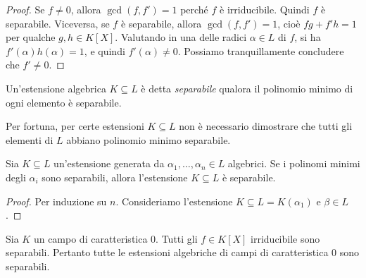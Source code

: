 \begin{proof}
Se $f \ne 0$, allora $\gcd(f, f') = 1$ perché $f$ è irriducibile. Quindi $f$ è separabile. Viceversa, se $f$ è separabile, allora $\gcd(f, f') = 1$, cioè $fg + f'h = 1$ per qualche $g, h \in K[X]$. Valutando in una delle radici $\alpha \in L$ di $f$, si ha $f'(\alpha) h(\alpha) = 1$, e quindi $f'(\alpha) \ne 0$. Possiamo tranquillamente concludere che $f' \ne 0$.
\end{proof}

\begin{defi}
Un'estensione algebrica $K \subseteq L$ è detta {\em separabile} qualora il polinomio minimo di ogni elemento è separabile.
\end{defi}

Per fortuna, per certe estensioni $K \subseteq L$ non è necessario dimostrare che tutti gli elementi di $L$ abbiano polinomio minimo separabile.

\begin{prop}
Sia $K \subseteq L$ un'estensione generata da $\alpha_1, \dots{}, \alpha_n \in L$ algebrici. Se i polinomi minimi degli $\alpha_i$ sono separabili, allora l'estensione $K \subseteq L$ è separabile.
\end{prop}

\begin{proof}
Per induzione su $n$. Consideriamo l'estensione $K \subseteq L = K(\alpha_1)$ e $\beta \in L$. 
\end{proof}

\begin{defi}
\end{defi}

\begin{prop}
Sia $K$ un campo di caratteristica $0$. Tutti gli $f \in K[X]$ irriducibile sono separabili. Pertanto tutte le estensioni algebriche di campi di caratteristica $0$ sono separabili. 
\end{prop}

